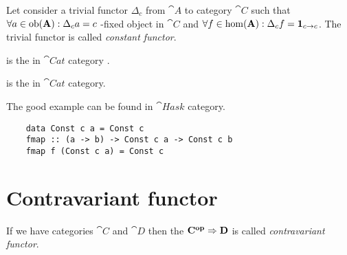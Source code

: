 \begin{definition}
  \label{def:const_functor}
  Let consider a trivial functor $\Delta_c$ from 
  $\cat{A}$ to category $\cat{C}$ such that $\forall a \in \mathrm{ob}(\mathbf{A}):
  \Delta_c a = c$ -fixed object in $\cat{C}$ and 
  $\forall f \in \mathrm{hom}(\mathbf{A}): \Delta_c f = \mathbf{1}_{ c \to c }$. The trivial
  functor is called \textit{constant functor}.
\end{definition}

\begin{example}
  \label{ex:initial_object_cat}
   is the 
  in $\cat{Cat}$ category \cite{bib:stackexchange:empty_category}.
\end{example}

\begin{example}
  \label{ex:terminal_object_cat}
   is the 
  in $\cat{Cat}$ category.
\end{example}


The good example can be found in $\cat{Hask}$ category.
\begin{example}
  \label{ex:const_functor_hask}
  \begin{verbatim}
    data Const c a = Const c
    fmap :: (a -> b) -> Const c a -> Const c b
    fmap f (Const c a) = Const c
  \end{verbatim}
\end{example}

\section{Contravariant functor}
\begin{definition}
  \label{def:contravariant_functor}
  If we have categories $\cat{C}$ and $\cat{D}$ then the
   $\mathbf{C^{op}} \Rightarrow \mathbf{D}$ is called
  \textit{contravariant functor}. 
\end{definition}

